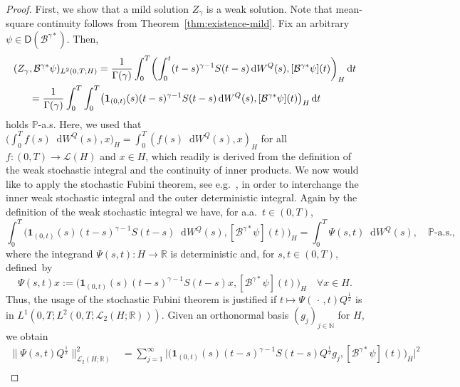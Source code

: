 \documentclass[reqno]{amsart}
\numberwithin{equation}{section}
\newcommand{\bbP}{\mathbb{P}}
\newcommand{\R}{\mathbb{R}}
\newcommand{\N}{\mathbb{N}}
\newcommand{\cB}{\mathcal{B}}
\newcommand{\rd}{\mathop{}\!\mathrm{d}}
\newcommand{\from}{\colon}
\theoremstyle{remark}
\theoremstyle{definition}
\begin{document}
\begin{proof}
	First, we show 
	that a mild solution $Z_\gamma$ 
	is a weak solution. 
	Note that mean-square continuity follows 
	from Theorem~\ref{thm:existence-mild}. 
	Fix an arbitrary $\psi \in \mathsf D(\cB^{\gamma*})$. 
	Then, 
	\begin{align}
	( Z_\gamma&, \cB^{\gamma*}\psi )_{L^2(0,T;H)} 
	= 
	\frac{1}{\Gamma(\gamma)} 
	\int_0^T 
	\biggl (\int_0^t (t-s)^{\gamma-1} S(t-s) \rd W^Q(s), 
	[\cB^{\gamma*}\psi](t) \biggr)_H \rd t 
	\notag 
	\\
	&= \frac{1}{\Gamma(\gamma)} 
	\int_0^T \int_0^T 
	\bigl( \mathbf 1_{(0,t)}(s) (t-s)^{\gamma-1}S(t-s) \rd W^Q(s), 
	[\cB^{\gamma*}\psi](t) \bigr)_H \rd t 
	\label{eq:proof:prop:fractional-mild-equiv-weak-zeroIC}
	\end{align} 
	holds $\bbP$-a.s. 
	Here, we used that  
	$\bigl( \int_0^T f(s) \rd W^Q(s), x \bigr)_H 
	= \int_0^T (f(s) \rd W^Q(s), x)_H$ 
	for all 
	$f \from (0,T) \to \mathscr L(H)$ 
	and $x \in H$, which
	readily is derived from the definition 
	of the weak stochastic integral 
	and the continuity of inner products. 
	We now would like to apply the stochastic Fubini theorem, 
	see e.g.\ \cite[Theorem~8.14]{Peszat_zabczyk_2007}, 
	in order to interchange 
	the inner weak stochastic integral 
	and the outer deterministic integral. 
	Again by the definition of the weak stochastic integral 
	we have, 
	for a.a.\ $t\in(0,T)$, 
	\[ 
	\int_0^T 
	\bigl( \mathbf 1_{(0,t)}(s) (t-s)^{\gamma-1} S(t-s) \rd W^Q(s), 
	[\cB^{\gamma*}\psi](t) \bigr)_H 
	= \int_0^T \Psi(s,t) \rd W^Q(s), 
	\quad 
	\bbP\text{-a.s.},  
	\] 
	where the integrand 
	$\Psi(s,t)\from H \to \R$ 
	is deterministic and, 
	for $s,t \in (0,T)$,  
	defined~by 
	\begin{equation}\label{eq:def-weak-integrand} 
	\Psi(s,t) x 
	:= 
	\bigl( \mathbf 1_{(0,t)}(s) (t-s)^{\gamma-1} S(t-s) x, 
	[\cB^{\gamma*}\psi](t) \bigr)_H 
	\quad 
	\forall x\in H.   
	\end{equation}
	Thus, the usage of the stochastic Fubini theorem 
	is justified if  
	$t\mapsto \Psi(\,\cdot\,, t)Q^{\frac{1}{2}}$ 
	is in  
	$L^1(0,T; L^2(0,T;\mathscr L_2(H;\R)))$. 
	Given an orthonormal basis 
	$(g_j)_{j\in\N}$ for $H$, we obtain  
	\begin{align*}
	\bigl\| \Psi(s,t) Q^{\frac{1}{2}} \bigr\|_{\mathscr L_2(H;\R)}^2 
	&= 
	\sum_{j=1}^\infty 
	\bigl| \bigl( \mathbf 1_{(0,t)}(s) (t-s)^{\gamma-1}S(t-s) Q^\frac{1}{2} g_j, 
	[\cB^{\gamma*}\psi](t) \bigr)_H \bigr|^2 
	\\

\end{align*}
\end{proof}
\end{document}
